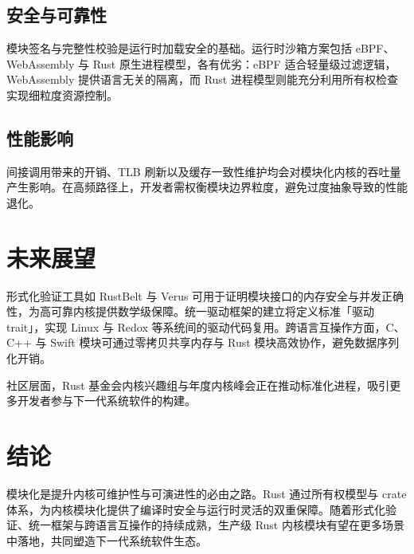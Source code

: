 \section{安全与可靠性}
模块签名与完整性校验是运行时加载安全的基础。运行时沙箱方案包括 eBPF、WebAssembly 与 Rust 原生进程模型，各有优劣：eBPF 适合轻量级过滤逻辑，WebAssembly 提供语言无关的隔离，而 Rust 进程模型则能充分利用所有权检查实现细粒度资源控制。\par
\section{性能影响}
间接调用带来的开销、TLB 刷新以及缓存一致性维护均会对模块化内核的吞吐量产生影响。在高频路径上，开发者需权衡模块边界粒度，避免过度抽象导致的性能退化。\par
\chapter{未来展望}
形式化验证工具如 RustBelt 与 Verus 可用于证明模块接口的内存安全与并发正确性，为高可靠内核提供数学级保障。统一驱动框架的建立将定义标准「驱动 trait」，实现 Linux 与 Redox 等系统间的驱动代码复用。跨语言互操作方面，C、C++ 与 Swift 模块可通过零拷贝共享内存与 Rust 模块高效协作，避免数据序列化开销。\par
社区层面，Rust 基金会内核兴趣组与年度内核峰会正在推动标准化进程，吸引更多开发者参与下一代系统软件的构建。\par
\chapter{结论}
模块化是提升内核可维护性与可演进性的必由之路。Rust 通过所有权模型与 crate 体系，为内核模块化提供了编译时安全与运行时灵活的双重保障。随着形式化验证、统一框架与跨语言互操作的持续成熟，生产级 Rust 内核模块有望在更多场景中落地，共同塑造下一代系统软件生态。\par
